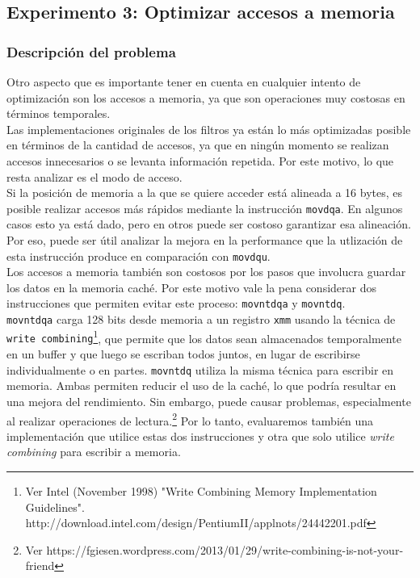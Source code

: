 \documentclass[a4paper]{article}
\begin{document}
\subsection{Experimento 3: Optimizar accesos a memoria}
\subsubsection{Descripción del problema}

Otro aspecto que es importante tener en cuenta en cualquier intento de optimización son los accesos a memoria, ya que son operaciones muy costosas en términos temporales. \\
Las implementaciones originales de los filtros ya están lo más optimizadas posible en términos de la cantidad de accesos, ya que en ningún momento se realizan accesos innecesarios o se levanta información repetida. Por este motivo, lo que resta analizar es el modo de acceso. \\
Si la posición de memoria a la que se quiere acceder está alineada a 16 bytes, es posible realizar accesos más rápidos mediante la instrucción {\tt movdqa}. En algunos casos esto ya está dado, pero en otros puede ser costoso garantizar esa alineación. Por eso, puede ser útil analizar la mejora en la performance que la utlización de esta instrucción produce en comparación con {\tt movdqu}. \\
Los accesos a memoria también son costosos por los pasos que involucra guardar los datos en la memoria caché. Por este motivo vale la pena considerar dos instrucciones que permiten evitar este proceso: {\tt movntdqa} y {\tt movntdq}. \\
{\tt movntdqa} carga 128 bits desde memoria a un registro {\tt xmm} usando la técnica de {\tt write combining}\footnote{Ver Intel (November 1998) "Write Combining Memory Implementation Guidelines". \\ http://download.intel.com/design/PentiumII/applnots/24442201.pdf}, que permite que los datos sean almacenados temporalmente en un buffer y que luego se escriban todos juntos, en lugar de escribirse individualmente o en partes. {\tt movntdq} utiliza la misma técnica para escribir en memoria. Ambas permiten reducir el uso de la caché, lo que podría resultar en una mejora del rendimiento. Sin embargo, puede causar problemas, especialmente al realizar operaciones de lectura.\footnote{Ver https://fgiesen.wordpress.com/2013/01/29/write-combining-is-not-your-friend} Por lo tanto, evaluaremos también una implementación que utilice estas dos instrucciones y otra que solo utilice \textit{write combining} para escribir a memoria. \\
\end{document}
